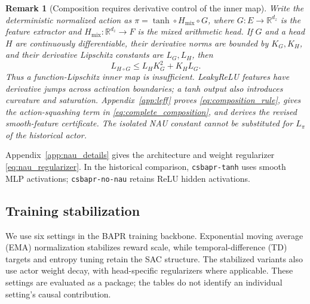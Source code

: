 \documentclass[10pt]{article}
\newtheorem{remark}[theorem]{Remark}
\begin{document}
\begin{remark}[Composition requires derivative control of the inner map]
\label{rem:theory_practice}
Write the deterministic normalized action as
$\pi=\tanh\circ H_{\mathrm{mix}}\circ G$, where $G:E\to\mathbb R^{d_z}$ is the feature extractor and $H_{\mathrm{mix}}:\mathbb R^{d_z}\to F$ is the mixed arithmetic head.
If $G$ and a head $H$ are continuously differentiable, their derivative norms are bounded by $K_G,K_H$, and their derivative Lipschitz constants are $L_G,L_H$, then
\begin{equation}
L_{H\circ G}\leq L_HK_G^2+K_HL_G.
\label{eq:composition_rule}
\end{equation}
Thus a function-Lipschitz inner map is insufficient. LeakyReLU features have derivative jumps across activation boundaries; a tanh output also introduces curvature and saturation. Appendix~\ref{app:leff} proves \eqref{eq:composition_rule}, gives the action-squashing term in \eqref{eq:complete_composition}, and derives the revised smooth-feature certificate. The isolated NAU constant cannot be substituted for $L_\pi$ of the historical actor.
\end{remark}
Appendix~\ref{app:nau_details} gives the architecture and weight regularizer \eqref{eq:nau_regularizer}. In the historical comparison, \texttt{csbapr-tanh} uses smooth MLP activations; \texttt{csbapr-no-nau} retains ReLU hidden activations.

\subsection{Training stabilization}
\label{sec:training_fixes}

We use six settings in the BAPR training backbone. Exponential moving average (EMA) normalization stabilizes reward scale, while temporal-difference (TD) targets and entropy tuning retain the SAC structure. The stabilized variants also use actor weight decay, with head-specific regularizers where applicable. These settings are evaluated as a package; the tables do not identify an individual setting's causal contribution.
\end{document}

